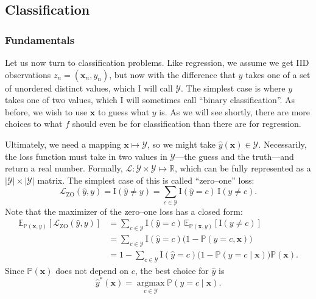 \subsection{Classification}
\subsubsection{Fundamentals}
Let us now turn to classification problems. Like regression, we assume we get IID observations $z_n = (\mathbf{x}_n, y_n)$, but now with the difference that $y$ takes one of a set of unordered distinct values, which I will call $\mathcal{Y}$. The simplest case is where $y$ takes one of two values, which I will sometimes call ``binary classification''. As before, we wish to use $\mathbf{x}$ to guess what $y$ is. As we will see shortly, there are more choices to what $f$ should even be for classification than there are for regression.

Ultimately, we need a mapping $\mathbf{x} \mapsto \mathcal{Y}$, so we might take $\hat{y}(\mathbf{x}) \in \mathcal{Y}$. Necessarily, the loss function must take in two values in $\mathcal{Y}$---the guess and the truth---and return a real number. Formally, $\mathscr{L}: \mathcal{Y} \times \mathcal{Y} \mapsto \mathbb{R}$, which can be fully represented as a $|\mathcal{Y}| \times |\mathcal{Y}|$ matrix.
The simplest case of this is called ``zero--one'' loss:
\[
\mathscr{L}_{\text{ZO}}(\hat{y}, y) = \mathrm{I}(\hat{y} \neq y) = \sum_{c \in \mathcal{Y}} \mathrm{I}(\hat{y} = c)\, \mathrm{I}(y \neq c).
\]
Note that the maximizer of the zero--one loss has a closed form:
\begin{align*}
\mathbb{E}_{\mathbb{P}(\mathbf{x},y)}\left[\mathscr{L}_{\text{ZO}}(\hat{y}, y)\right]
&= \sum_{c \in \mathcal{Y}} \mathrm{I}(\hat{y} = c)\, \mathbb{E}_{\mathbb{P}(\mathbf{x},y)}\left[\mathrm{I}(y \neq c)\right] \\
&= \sum_{c \in \mathcal{Y}} \mathrm{I}(\hat{y} = c)\bigl(1 - \mathbb{P}(y = c, \mathbf{x})\bigr) \\
&= 1 - \sum_{c \in \mathcal{Y}} \mathrm{I}(\hat{y} = c)\bigl(1 - \mathbb{P}(y = c \mid \mathbf{x})\bigr)\mathbb{P}(\mathbf{x}).
\end{align*}
Since $\mathbb{P}(\mathbf{x})$ does not depend on $c$, the best choice for $\hat{y}$ is
\begin{equation*}
\hat{y}^*(\mathbf{x}) = \operatorname*{argmax}_{c \in \mathcal{Y}} \mathbb{P}(y = c \mid \mathbf{x}).
\end{equation*}

